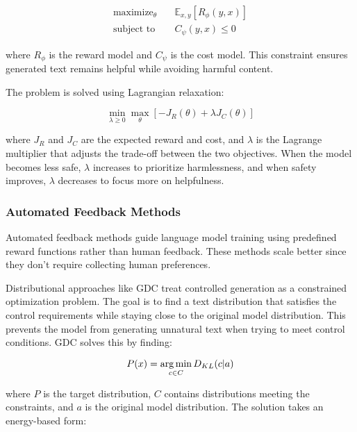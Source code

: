 \begin{equation}
\begin{aligned}
    \text{maximize}_\theta & \quad \mathbb{E}_{x,y}[R_\phi(y,x)] \\
    \text{subject to} & \quad C_\psi(y,x) \leq 0
\end{aligned}
\end{equation}

where $R_\phi$ is the reward model and $C_\psi$ is the cost model. This constraint ensures generated text remains helpful while avoiding harmful content.

The problem is solved using Lagrangian relaxation:

\begin{equation}
    \min_{\lambda \geq 0} \max_\theta [-J_R(\theta) + \lambda J_C(\theta)]
\end{equation}

where $J_R$ and $J_C$ are the expected reward and cost, and $\lambda$ is the Lagrange multiplier that adjusts the trade-off between the two objectives.
When the model becomes less safe, $\lambda$ increases to prioritize harmlessness, and when safety improves, $\lambda$ decreases to focus more on helpfulness.

\subsubsection{Automated Feedback Methods}

Automated feedback methods guide language model training using predefined reward functions rather than human feedback. 
These methods scale better since they don't require collecting human preferences. 

Distributional approaches like GDC \cite{khalifa2021distributionalapproachcontrolledtext} treat controlled generation as a constrained optimization problem. 
The goal is to find a text distribution that satisfies the control requirements while staying close to the original model distribution. This prevents the model from generating unnatural text when trying to meet control conditions. 
GDC solves this by finding:

\begin{equation}
P(x) = \operatorname*{arg\,min}_{c \in C} D_{KL}(c | a)
\end{equation}

where $P$ is the target distribution, $C$ contains distributions meeting the constraints, and $a$ is the original model distribution. The solution takes an energy-based form:


